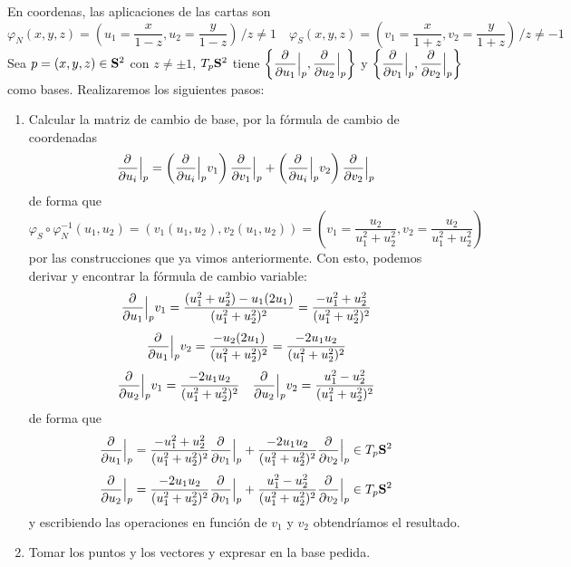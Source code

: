 \begin{sol}
    En coordenas, las aplicaciones de las cartas son
    $$\varphi_N(x,y,z)=\left(u_1 = \dfrac{x}{1-z},u_2 = \dfrac{y}{1-z}\right) \, / z \neq 1 \quad \varphi_S(x,y,z)=\left(v_1 = \dfrac{x}{1+z},v_2 = \dfrac{y}{1+z}\right) \, /  z \neq-1$$
    Sea $p = (x,y,z) \in \bold S^2$ con $z \neq \pm 1$, $T_p\bold S^2$ tiene $\left\{ \dfrac{\partial^{} }{\partial u_1} \Big|_p,  \dfrac{\partial^{} }{\partial u_2} \Big|_p \right\}$ y $\left\{ \dfrac{\partial^{} }{\partial v_1} \Big|_p,  \dfrac{\partial^{} }{\partial v_2} \Big|_p \right\}$ como bases. Realizaremos los siguientes pasos:
    \begin{enumerate}
        \item Calcular la matriz de cambio de base, por la f\'ormula de cambio de coordenadas
        $$\dfrac{\partial^{} }{\partial u_i} \Big|_p = \left( \dfrac{\partial^{} }{\partial u_i} \Big|_p v_1\right)\dfrac{\partial^{} }{\partial v_1} \Big|_p + \left( \dfrac{\partial^{} }{\partial u_i} \Big|_p v_2\right)\dfrac{\partial^{} }{\partial v_2} \Big|_p$$
        de forma que
        $$\varphi_S \circ \varphi_N^{-1}(u_1,u_2) = (v_1(u_1,u_2), v_2(u_1,u_2))=\left( v_1=\dfrac{u_2}{u_1^2+u_2^2}, v_2=\dfrac{u_2}{u_1^2+u_2^2}\right)$$
        por las construcciones que ya vimos anteriormente. Con esto, podemos derivar y encontrar la f\'ormula de cambio variable:
        $$\dfrac{\partial^{} }{\partial u_1} \Big|_p v_1 = \dfrac{(u_1^2+u_2^2) - u_1(2u_1)}{(u_1^2+u_2^2)^2} = \dfrac{-u_1^2+u_2^2}{(u_1^2+u_2^2)^2}$$
        $$\dfrac{\partial^{} }{\partial u_1} \Big|_p v_2 = \dfrac{- u_2(2u_1)}{(u_1^2+u_2^2)^2} =  \dfrac{-2u_1u_2}{(u_1^2+u_2^2)^2}$$
        $$\dfrac{\partial^{} }{\partial u_2} \Big|_p v_1 = \dfrac{-2u_1u_2}{(u_1^2+u_2^2)^2} \quad \dfrac{\partial^{} }{\partial u_2} \Big|_p v_2 =\dfrac{u_1^2-u_2^2}{(u_1^2+u_2^2)^2} $$
        de forma que 
        $$\dfrac{\partial^{} }{\partial u_1} \Big|_p = \dfrac{-u_1^2+u_2^2}{(u_1^2+u_2^2)^2}\dfrac{\partial^{} }{\partial v_1} \Big|_p +\dfrac{-2u_1u_2}{(u_1^2+u_2^2)^2}\dfrac{\partial^{} }{\partial v_2} \Big|_p \in T_p\bold S^2$$
        $$\dfrac{\partial^{} }{\partial u_2} \Big|_p =\dfrac{-2u_1u_2}{(u_1^2+u_2^2)^2} \dfrac{\partial^{} }{\partial v_1} \Big|_p +\dfrac{u_1^2-u_2^2}{(u_1^2+u_2^2)^2}\dfrac{\partial^{} }{\partial v_2} \Big|_p \in T_p\bold S^2 $$
        y escribiendo las operaciones en funci\'on de $v_1$ y $v_2$ obtendr\'iamos el resultado.

        \item Tomar los puntos y los vectores y expresar en la base pedida.


\end{enumerate}
\end{sol}
